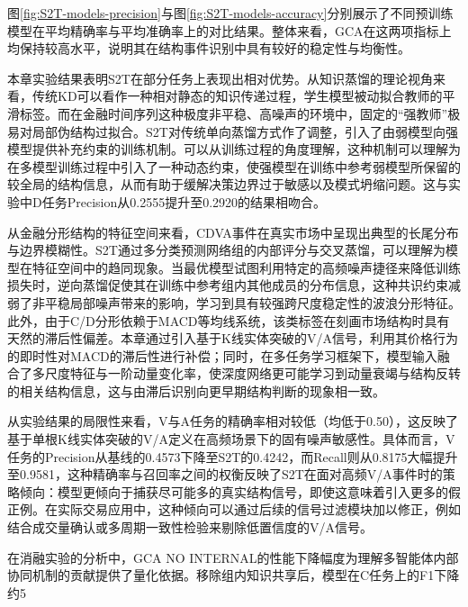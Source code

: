 图\ref{fig:S2T-models-precision}与图\ref{fig:S2T-models-accuracy}分别展示了不同预训练模型在平均精确率与平均准确率上的对比结果。整体来看，GCA在这两项指标上均保持较高水平，说明其在结构事件识别中具有较好的稳定性与均衡性。

本章实验结果表明S2T在部分任务上表现出相对优势。从知识蒸馏的理论视角来看，传统KD可以看作一种相对静态的知识传递过程，学生模型被动拟合教师的平滑标签。而在金融时间序列这种极度非平稳、高噪声的环境中，固定的``强教师''极易对局部伪结构过拟合。S2T对传统单向蒸馏方式作了调整，引入了由弱模型向强模型提供补充约束的训练机制。可以从训练过程的角度理解，这种机制可以理解为在多模型训练过程中引入了一种动态约束，使强模型在训练中参考弱模型所保留的较全局的结构信息，从而有助于缓解决策边界过于敏感以及模式坍缩问题。这与实验中D任务Precision从0.2555提升至0.2920的结果相吻合。

从金融分形结构的特征空间来看，CDVA事件在真实市场中呈现出典型的长尾分布与边界模糊性。S2T通过多分类预测网络组的内部评分与交叉蒸馏，可以理解为模型在特征空间中的趋同现象。当最优模型试图利用特定的高频噪声捷径来降低训练损失时，逆向蒸馏促使其在训练中参考组内其他成员的分布信息，这种共识约束减弱了非平稳局部噪声带来的影响，学习到具有较强跨尺度稳定性的波浪分形特征。此外，由于C/D分形依赖于MACD等均线系统，该类标签在刻画市场结构时具有天然的滞后性偏差。本章通过引入基于K线实体突破的V/A信号，利用其价格行为的即时性对MACD的滞后性进行补偿；同时，在多任务学习框架下，模型输入融合了多尺度特征与一阶动量变化率，使深度网络更可能学习到动量衰竭与结构反转的相关结构信息，这与由滞后识别向更早期结构判断的现象相一致。

从实验结果的局限性来看，V与A任务的精确率相对较低（均低于0.50），这反映了基于单根K线实体突破的V/A定义在高频场景下的固有噪声敏感性。具体而言，V任务的Precision从基线的0.4573下降至S2T的0.4242，而Recall则从0.8175大幅提升至0.9581，这种精确率与召回率之间的权衡反映了S2T在面对高频V/A事件时的策略倾向：模型更倾向于捕获尽可能多的真实结构信号，即使这意味着引入更多的假正例。在实际交易应用中，这种倾向可以通过后续的信号过滤模块加以修正，例如结合成交量确认或多周期一致性检验来剔除低置信度的V/A信号。

在消融实验的分析中，GCA NO INTERNAL的性能下降幅度为理解多智能体内部协同机制的贡献提供了量化依据。移除组内知识共享后，模型在C任务上的F1下降约5%

